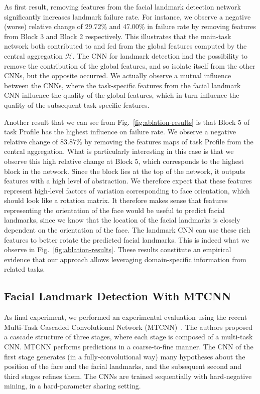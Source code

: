 \documentclass[runningheads]{llncs}
\newcommand{\citep}{\cite}
\begin{document}
As first result, removing features from the facial landmark detection network significantly increases landmark failure rate. For instance, we observe a negative (worse) relative change of 29.72\% and 47.00\% in failure rate by removing features from Block 3 and Block 2 respectively. This illustrates that the main-task network both contributed to and fed from the global features computed by the central aggregation $\mathcal{H}$. The CNN for landmark detection had the possibility to remove the contribution of the global features, and so isolate itself from the other CNNs, but the opposite occurred. We actually observe a mutual influence between the CNNs, where the task-specific features from the facial landmark CNN influence the quality of the global features, which in turn influence the quality of the subsequent task-specific features.

Another result that we can see from Fig.~\ref{fig:ablation-results} is that Block 5 of task Profile has the highest influence on failure rate. We observe a negative relative change of 83.87\% by removing the features maps of task Profile from the central aggregation. What is particularly interesting in this case is that we observe this high relative change at Block 5, which corresponds to the highest block in the network. Since the block lies at the top of the network, it outputs features with a high level of abstraction. We therefore expect that these features represent high-level factors of variation corresponding to face orientation, which should look like a rotation matrix. It therefore makes sense that features representing the orientation of the face would be useful to predict facial landmarks, since we know that the location of the facial landmarks is closely dependent on the orientation of the face. The landmark CNN can use these rich features to better rotate the predicted facial landmarks. This is indeed what we observe in Fig.~\ref{fig:ablation-results}. These results constitute an empirical evidence that our approach allows leveraging domain-specific information from related tasks.


\subsection{Facial Landmark Detection With MTCNN}
\label{ssec:mtcnn}

As final experiment, we performed an experimental evaluation using the recent Multi-Task Cascaded Convolutional Network (MTCNN)~\citep{zhang2016joint}. The authors proposed a cascade structure of three stages, where each stage is composed of a multi-task CNN. MTCNN performs predictions in a coarse-to-fine manner. The CNN of the first stage generates (in a fully-convolutional way) many hypotheses about the position of the face and the facial landmarks, and the subsequent second and third stages refines them. The CNNs are trained sequentially with hard-negative mining, in a hard-parameter sharing setting. 
\end{document}
